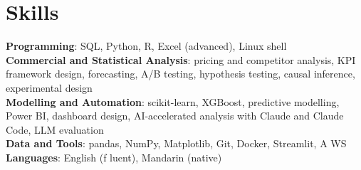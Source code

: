 \documentclass[letterpaper,11pt]{article}
\begin{document}
\section{\textbf{Skills}}
 \begin{itemize}[leftmargin=0.15in, label={}]
    \small{\item{
     \textbf{Programming}{: SQL, Python, R, Excel (advanced), Linux shell} \\
     \textbf{Commercial and Statistical Analysis}{: pricing and competitor analysis, KPI framework design, forecasting, A/B testing, hypothesis testing, causal inference, experimental design} \\
     \textbf{Modelling and Automation}{: scikit-learn, XGBoost, predictive modelling, Power BI, dashboard design, AI-accelerated analysis with Claude and Claude Code, LLM evaluation} \\
     \textbf{Data and Tools}{: pandas, NumPy, Matplotlib, Git, Docker, Streamlit, A\kern0pt WS} \\
     \textbf{Languages}{: English (f\kern0pt luent), Mandarin (native)}}}

 \end{itemize}
\end{document}
